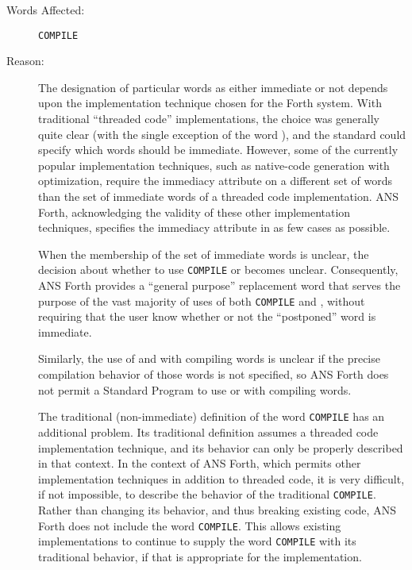 \begin{description}
\item[Words Affected:]
	\texttt{COMPILE}	\word{[COMPILE]}
	\word{[']}			

\item[Reason:]
	The designation of particular words as either immediate or not
	depends upon the implementation technique chosen for the Forth
	system. With traditional ``threaded code'' implementations, the
	choice was generally quite clear (with the single exception of
	the word ), and the standard could specify which words
	should be immediate. However, some of the currently popular
	implementation techniques, such as native-code generation with
	optimization, require the immediacy attribute on a different set
	of words than the set of immediate words of a threaded code
	implementation. ANS Forth, acknowledging the validity of these
	other implementation techniques, specifies the immediacy attribute
	in as few cases as possible.

	When the membership of the set of immediate words is unclear, the
	decision about whether to use \texttt{COMPILE} or \word{[COMPILE]}
	becomes unclear. Consequently, ANS Forth provides a ``general
	purpose'' replacement word  that serves the purpose
	of the vast majority of uses of both \texttt{COMPILE} and
	\word{[COMPILE]}, without requiring that the user know whether or
	not the ``postponed'' word is immediate.

	Similarly, the use of  and \word{[']} with compiling words
	is unclear if the precise compilation behavior of those words is
	not specified, so ANS Forth does not permit a Standard Program to
	use  or \word{[']} with compiling words.

	The traditional (non-immediate) definition of the word \texttt{COMPILE}
	has an additional problem. Its traditional definition assumes a
	threaded code implementation technique, and its behavior can only
	be properly described in that context. In the context of ANS Forth,
	which permits other implementation techniques in addition to
	threaded code, it is very difficult, if not impossible, to describe
	the behavior of the traditional \texttt{COMPILE}. Rather than changing
	its behavior, and thus breaking existing code, ANS Forth does not
	include the word \texttt{COMPILE}. This allows existing implementations
	to continue to supply the word \texttt{COMPILE} with its traditional
	behavior, if that is appropriate for the implementation.


\end{description}
